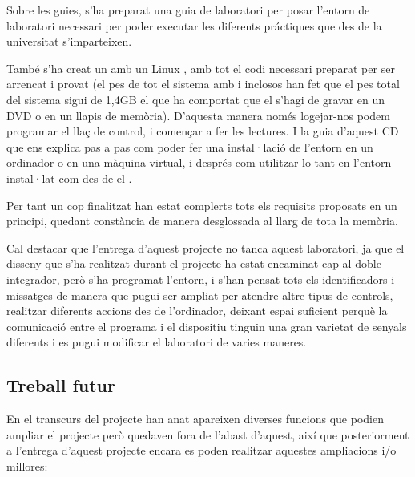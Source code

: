 Sobre les guies, s'ha preparat una guia de laboratori per posar l'entorn de laboratori necessari per poder executar les diferents práctiques que des de la universitat s'imparteixen.

També s'ha creat un \LiveCD amb un Linux \Ubuntu, amb tot el codi necessari preparat per ser arrencat i provat (el pes de tot el sistema amb \Eclipse i \MplabX inclosos han fet que el pes total del sistema sigui de 1,4GB el que ha comportat que el \LiveCD s'hagi de gravar en un DVD o en un llapis de memòria). D'aquesta manera només logejar-nos podem programar el llaç de control, i començar a fer les lectures. I la guia d'aquest CD que ens explica pas a pas com poder fer una instal·lació de l'entorn en un ordinador o en una màquina virtual, i després com utilitzar-lo tant en l'entorn instal·lat com des de el \LiveCD.

Per tant un cop finalitzat han estat complerts tots els requisits proposats en un principi, quedant constància de manera desglossada al llarg de tota la memòria. 


Cal destacar que l'entrega d'aquest projecte no tanca aquest laboratori, ja que el disseny que s'ha realitzat durant el projecte ha estat encaminat cap al doble integrador, però s'ha programat l'entorn, i s'han pensat tots els identificadors i missatges de manera que pugui ser ampliat per atendre altre tipus de controls, realitzar diferents accions des de l'ordinador, deixant espai suficient perquè la comunicació entre el programa \DCSMonitor i el dispositiu \Monitor tinguin una gran varietat de senyals diferents i es pugui modificar el laboratori de varies maneres.
 
\subsection{Treball futur}

En el transcurs del projecte han anat apareixen diverses funcions que podien ampliar el projecte però quedaven fora de l'abast d'aquest, així que posteriorment a l'entrega d'aquest projecte encara es poden realitzar aquestes ampliacions i/o millores:

